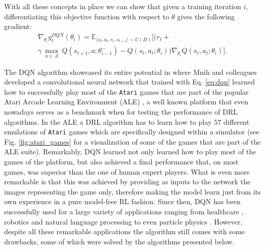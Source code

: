 With all these concepts in place we can show that given a training iteration $i$, differentiating this objective function with respect to $\theta$ gives the following gradient: 
\begin{multline}
\nabla_{\theta_{i}}y^{DQN}_{t}(\theta_{i}) = \mathds{E}_{\langle s_{t},a_{t},r_{t},s_{t+1}\rangle\sim U(D)} \bigg[\big(r_{t} + \\ \gamma \: \underset{a\in \mathcal{A}}{\max}\: Q(s_{t+1}, a; \theta^{-}_{i-1})  - Q(s_{t}, a_{t}; \theta_{i})\big)\nabla_{\theta_{i}} Q(s_{t}, a_{t}; \theta_{i})\bigg].
\label{eq:dqn_gradient}
\end{multline}

The DQN algorithm showcased its entire potential in \cite{mnih2015human} where Mnih and colleagues developed a convolutional neural network that trained with Eq. \ref{eq:dqn} learned how to successfully play most of the \texttt{Atari} games that are part of the popular Atari Arcade Learning Environment (ALE) \cite{bellemare2013arcade}, a well known platform that even nowadays serves as a benchmark when for testing the performance of DRL algorithms. In the ALE a DRL algorithm has to learn how to play $57$ different emulations of \texttt{Atari} games which are specifically designed within a simulator (see Fig. \ref{fig:atari_games} for a visualization of some of the games that are part of the ALE suite). Remarkably, DQN learned not only learned how to play most of the games of the platform, but also achieved a final performance that, on most games, was superior than the one of human expert players. What is even more remarkable is that this was achieved by providing as inputs to the network the images representing the game only, therefore making the model learn just from its own experience in a pure model-free RL fashion. Since then, DQN has been successfully used for a large variety of applications ranging from healthcare \cite{tseng2017deep,raghu2017continuous}, robotics \cite{kalashnikov2018qt} and natural language processing \cite{he2015deep, narasimhan2015language} to even particle physics \cite{liu2017learning, sajedian2020design}. However, despite all these remarkable applications the algorithm still comes with some drawbacks, some of which were solved by the algorithms presented below.

